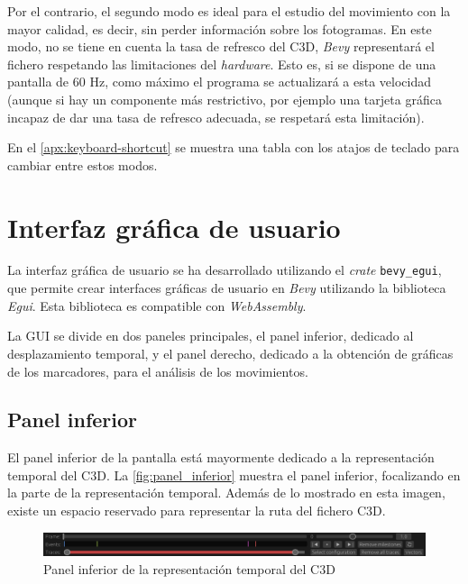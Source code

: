 Por el contrario, el segundo modo es ideal para el estudio del movimiento con la mayor calidad, es decir, sin perder información sobre los fotogramas. En este modo, no se tiene en cuenta la tasa de refresco del \ac{C3D}, \textit{Bevy} representará el fichero respetando las limitaciones del \textit{hardware}. Esto es, si se dispone de una pantalla de 60 \ac{Hz}, como máximo el programa se actualizará a esta velocidad (aunque si hay un componente más restrictivo, por ejemplo una tarjeta gráfica incapaz de dar una tasa de refresco adecuada, se respetará esta limitación). 

En el \autoref{apx:keyboard-shortcut} se muestra una tabla con los atajos de teclado para cambiar entre estos modos.

\section{Interfaz gráfica de usuario} \label{sec:gui}
La interfaz gráfica de usuario se ha desarrollado utilizando el \textit{crate} \texttt{bevy\_egui}, que permite crear interfaces gráficas de usuario en \textit{Bevy} utilizando la biblioteca \textit{Egui}. Esta biblioteca es compatible con \textit{WebAssembly}.

La \ac{GUI} se divide en dos paneles principales, el panel inferior, dedicado al desplazamiento temporal, y el panel derecho, dedicado a la obtención de gráficas de los marcadores, para el análisis de los movimientos. 

\subsection{Panel inferior} \label{sec:representacion-eventos}

El panel inferior de la pantalla está mayormente dedicado a la representación temporal del \ac{C3D}. La \autoref{fig:panel_inferior} muestra el panel inferior, focalizando en la parte de la representación temporal. Además de lo mostrado en esta imagen, existe un espacio reservado para representar la ruta del fichero \ac{C3D}.

\begin{figure}[H]
  \centering
  \includegraphics[width=\textwidth]{imagenes/panel_inf.png}
  \caption{Panel inferior de la representación temporal del \ac{C3D}}
  \label{fig:panel_inferior}
\end{figure}


